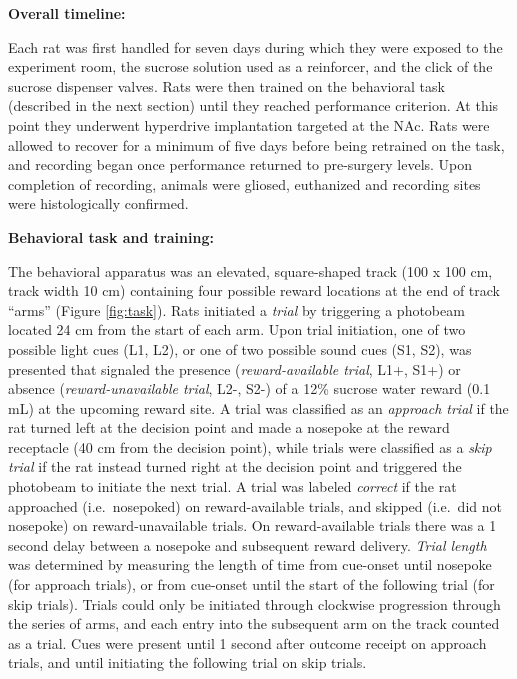 \documentclass[11pt]{article}
\begin{document}
{\bf Overall timeline:}

Each rat was first handled for seven days during which they were
exposed to the experiment room, the sucrose solution used as a
reinforcer, and the click of the sucrose dispenser valves. Rats were
then trained on the behavioral task (described in the next section)
until they reached performance criterion. At this point they
underwent hyperdrive implantation targeted at the NAc. Rats were
allowed to recover for a minimum of five days before being retrained
on the task, and recording began once performance returned to
pre-surgery levels. Upon completion of recording, animals were gliosed,
euthanized and recording sites were histologically confirmed.

{\bf Behavioral task and training:}

The behavioral apparatus was an elevated, square-shaped track (100 x
100 cm, track width 10 cm) containing four possible reward locations
at the end of track ``arms'' (Figure \ref{fig:task}). Rats initiated a
{\it trial} by triggering a photobeam located 24 cm from the start of
each arm. Upon trial initiation, one of two possible light cues (L1,
L2), or one of two possible sound cues (S1, S2), was presented that
signaled the presence ({\it reward-available trial}, L1+, S1+) or
absence ({\it reward-unavailable trial}, L2-, S2-) of a 12\% sucrose
water reward (0.1 mL) at the upcoming reward site. A trial was
classified as an {\it approach trial} if the rat turned left at the
decision point and made a nosepoke at the reward receptacle (40 cm
from the decision point), while trials were classified as a {\it skip
trial} if the rat instead turned right at the decision point and
triggered the photobeam to initiate the next trial. A trial was labeled
{\it correct} if the rat approached (i.e.\ nosepoked) on
reward-available trials, and skipped (i.e.\ did not nosepoke) on
reward-unavailable trials. On reward-available trials there was a 1
second delay between a nosepoke and subsequent reward delivery. {\it
Trial length} was determined by measuring the length of time from
cue-onset until nosepoke (for approach trials), or from cue-onset
until the start of the following trial (for skip trials). Trials could
only be initiated through clockwise progression through the series of
arms, and each entry into the subsequent arm on the track counted as a
trial. Cues were present until 1  second after outcome receipt on approach trials, and until initiating the following trial on skip trials.
\end{document}
